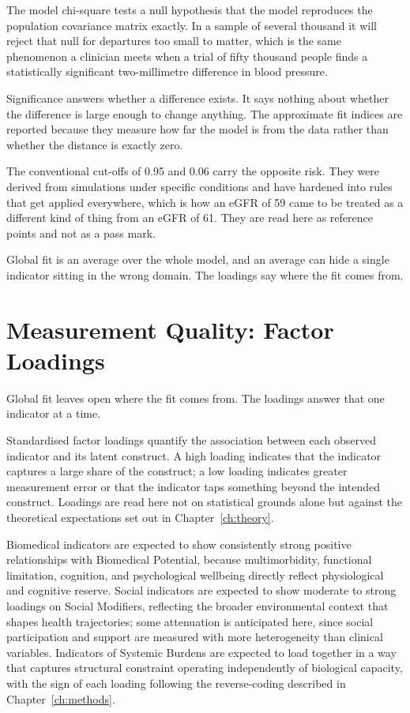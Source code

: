 \medskip
{}

\begin{reading}
The model chi-square tests a null hypothesis that the model reproduces the
population covariance matrix exactly. In a sample of several thousand it will
reject that null for departures too small to matter, which is the same
phenomenon a clinician meets when a trial of fifty thousand people finds a
statistically significant two-millimetre difference in blood pressure.

Significance answers whether a difference exists. It says nothing about whether
the difference is large enough to change anything. The approximate fit indices
are reported because they measure how far the model is from the data rather
than whether the distance is exactly zero.

The conventional cut-offs of 0.95 and 0.06 carry the opposite risk. They were
derived from simulations under specific conditions and have hardened into rules
that get applied everywhere, which is how an eGFR of 59 came to be treated as a
different kind of thing from an eGFR of 61. They are read here as reference
points and not as a pass mark.
\end{reading}

Global fit is an average over the whole model, and an average can hide a
single indicator sitting in the wrong domain. The loadings say where the fit
comes from.

\section{Measurement Quality: Factor Loadings}
\label{sec:anal-loadings}
Global fit leaves open where the fit comes from. The loadings answer that one indicator at a time.

Standardised factor loadings quantify the association between each observed indicator and its latent construct. A high loading indicates that the indicator captures a large share of the construct; a low loading indicates greater measurement error or that the indicator taps something beyond the intended construct. Loadings are read here not on statistical grounds alone but against the theoretical expectations set out in Chapter~\ref{ch:theory}.

Biomedical indicators are expected to show consistently strong positive relationships with Biomedical Potential, because multimorbidity, functional limitation, cognition, and psychological wellbeing directly reflect physiological and cognitive reserve. Social indicators are expected to show moderate to strong loadings on Social Modifiers, reflecting the broader environmental context that shapes health trajectories; some attenuation is anticipated here, since social participation and support are measured with more heterogeneity than clinical variables. Indicators of Systemic Burdens are expected to load together in a way that captures structural constraint operating independently of biological capacity, with the sign of each loading following the reverse-coding described in Chapter~\ref{ch:methods}.

